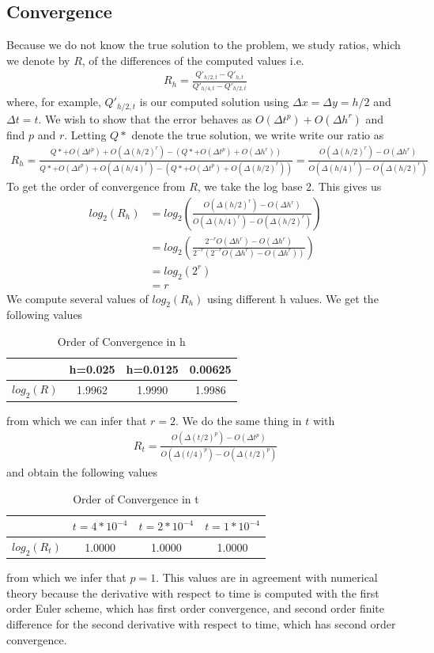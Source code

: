 \subsection{Convergence}
Because we do not know the true solution to the problem, we study ratios, which we denote by $R$, of the differences of the computed values i.e. 
\begin{align*}
R_h=\frac{Q'_{h/2,t} - Q'_{h,t}}{Q'_{h/4,t} - Q'_{h/2,t}}
\end{align*}
where, for example, $Q'_{h/2,t}$ is our computed solution using $\Delta x = \Delta y = h/2$ and $\Delta t = t$. We wish to show that the error behaves as $O(\Delta t^p) + O(\Delta h^r)$ and find $p$ and $r$. Letting $Q*$ denote the true solution, we write write our ratio as  
\begin{align*}
R_h = \frac{Q*+O(\Delta t^p) + O(\Delta (h/2)^r) - (Q* + O(\Delta t^p) + O(\Delta h^r))}{Q*+O(\Delta t^p) + O(\Delta (h/4)^r) - (Q*+O(\Delta t^p) + O(\Delta (h/2)^r))} = \frac{O(\Delta (h/2)^r)-O(\Delta h^r)}{O(\Delta (h/4)^r) - O(\Delta (h/2)^r)}
\end{align*}
To get the order of convergence from $R$, we take the log base 2. This gives us 
\begin{align*}
log_2(R_h) &= log_2(\frac{O(\Delta (h/2)^r)-O(\Delta h^r)}{O(\Delta (h/4)^r) - O(\Delta (h/2)^r)}) \\ 
&= log_2(\frac{2^{-r}O(\Delta h^r)-O(\Delta h^r)}{2^{-r}(2^{-r}O(\Delta h^r)-O(\Delta h^r))}) \\
&= log_2(2^{r}) \\
&= r
\end{align*}
We compute several values of $log_2(R_h)$ using different h values. We get the following values
\begin{table}[]
\centering
\caption{Order of Convergence in h}
\label{my-label}
\begin{tabular}{|c|c|c|c|}
\hline 
 & h=0.025 & h=0.0125 & 0.00625 \\ 
\hline 
$log_2(R)$ & 1.9962 & 1.9990 & 1.9986 \\ 
\hline 
\end{tabular} 
\end{table}
from which we can infer that $r = 2$. We do the same thing in $t$ with
\begin{align*}
R_t = \frac{O(\Delta (t/2)^p)-O(\Delta t^p)}{O(\Delta (t/4)^p) - O(\Delta (t/2)^p)}
\end{align*} 
and obtain the following values
\begin{table}[]
\centering
\caption{Order of Convergence in t}
\label{my-label}
\begin{tabular}{|c|c|c|c|}
\hline 
 & $t=4*10^{-4}$ & $t=2*10^{-4}$ & $t=1*10^{-4}$ \\ 
\hline 
$log_2(R_t)$ & 1.0000 & 1.0000 & 1.0000 \\ 
\hline 
\end{tabular} 
\end{table}
from which we infer that $p=1$. This values are in agreement with numerical theory because the derivative with respect to time is computed with the first order Euler scheme, which has first order convergence, and second order finite difference for the second derivative with respect to time, which has second order convergence. 


